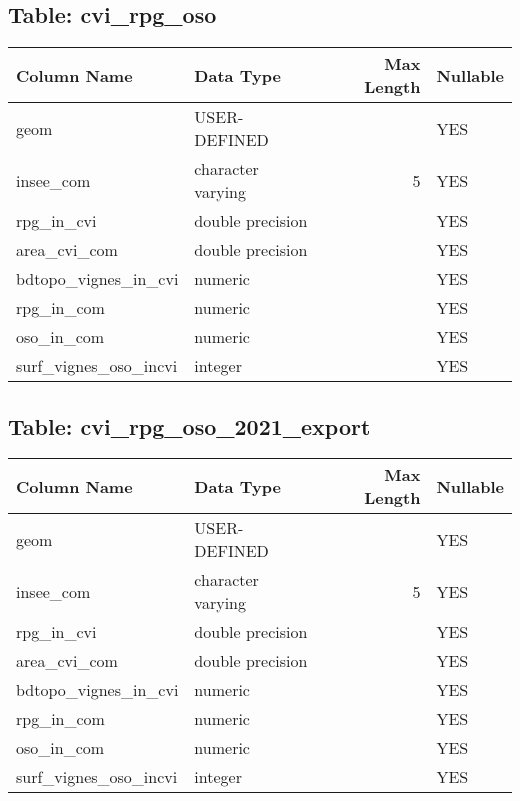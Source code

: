 \subsection*{Table: cvi_rpg_oso}
\begin{tabular}{llrl}
\hline
 Column Name           & Data Type         &   Max Length & Nullable   \\
\hline
 geom                  & USER-DEFINED      &              & YES        \\
 insee_com             & character varying &            5 & YES        \\
 rpg_in_cvi            & double precision  &              & YES        \\
 area_cvi_com          & double precision  &              & YES        \\
 bdtopo_vignes_in_cvi  & numeric           &              & YES        \\
 rpg_in_com            & numeric           &              & YES        \\
 oso_in_com            & numeric           &              & YES        \\
 surf_vignes_oso_incvi & integer           &              & YES        \\
\hline
\end{tabular}
\subsection*{Table: cvi_rpg_oso_2021_export}
\begin{tabular}{llrl}
\hline
 Column Name           & Data Type         &   Max Length & Nullable   \\
\hline
 geom                  & USER-DEFINED      &              & YES        \\
 insee_com             & character varying &            5 & YES        \\
 rpg_in_cvi            & double precision  &              & YES        \\
 area_cvi_com          & double precision  &              & YES        \\
 bdtopo_vignes_in_cvi  & numeric           &              & YES        \\
 rpg_in_com            & numeric           &              & YES        \\
 oso_in_com            & numeric           &              & YES        \\
 surf_vignes_oso_incvi & integer           &              & YES        \\
\hline
\end{tabular}
